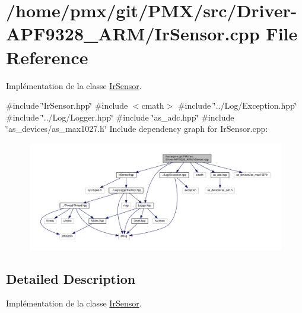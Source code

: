 \hypertarget{Driver-APF9328__ARM_2IrSensor_8cpp}{}\section{/home/pmx/git/\+P\+M\+X/src/\+Driver-\/\+A\+P\+F9328\+\_\+\+A\+R\+M/\+Ir\+Sensor.cpp File Reference}
\label{Driver-APF9328__ARM_2IrSensor_8cpp}


Implémentation de la classe \hyperlink{classIrSensor}{Ir\+Sensor}.  


{\ttfamily \#include \char`\"{}Ir\+Sensor.\+hpp\char`\"{}}\newline
{\ttfamily \#include $<$cmath$>$}\newline
{\ttfamily \#include \char`\"{}../\+Log/\+Exception.\+hpp\char`\"{}}\newline
{\ttfamily \#include \char`\"{}../\+Log/\+Logger.\+hpp\char`\"{}}\newline
{\ttfamily \#include \char`\"{}as\+\_\+adc.\+hpp\char`\"{}}\newline
{\ttfamily \#include \char`\"{}as\+\_\+devices/as\+\_\+max1027.\+h\char`\"{}}\newline
Include dependency graph for Ir\+Sensor.\+cpp\+:
\nopagebreak
\begin{figure}[H]
\begin{center}
\leavevmode
\includegraphics[width=350pt]{Driver-APF9328__ARM_2IrSensor_8cpp__incl}
\end{center}
\end{figure}


\subsection{Detailed Description}
Implémentation de la classe \hyperlink{classIrSensor}{Ir\+Sensor}. 

